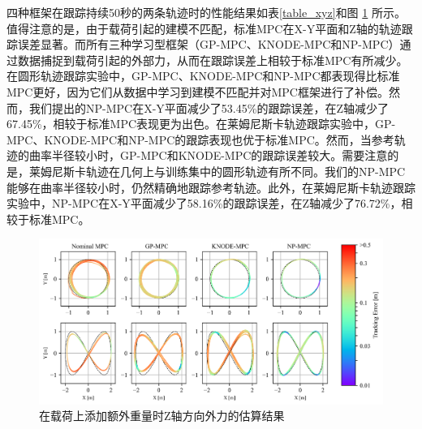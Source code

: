 \documentclass[lang=chs, degree=master, blindreview=false, winfonts=true]{yanputhesis}
\begin{document}
四种框架在跟踪持续50秒的两条轨迹时的性能结果如表\ref{table_xyz}和图 \ref{color} 所示。值得注意的是，由于载荷引起的建模不匹配，标准MPC在X-Y平面和Z轴的轨迹跟踪误差显著。而所有三种学习型框架（GP-MPC、KNODE-MPC和NP-MPC）通过数据捕捉到载荷引起的外部力，从而在跟踪误差上相较于标准MPC有所减少。在圆形轨迹跟踪实验中，GP-MPC、KNODE-MPC和NP-MPC都表现得比标准MPC更好，因为它们从数据中学习到建模不匹配并对MPC框架进行了补偿。然而，我们提出的NP-MPC在X-Y平面减少了53.45\%的跟踪误差，在Z轴减少了67.45\%，相较于标准MPC表现更为出色。在莱姆尼斯卡轨迹跟踪实验中，GP-MPC、KNODE-MPC和NP-MPC的跟踪表现也优于标准MPC。然而，当参考轨迹的曲率半径较小时，GP-MPC和KNODE-MPC的跟踪误差较大。需要注意的是，莱姆尼斯卡轨迹在几何上与训练集中的圆形轨迹有所不同。我们的NP-MPC能够在曲率半径较小时，仍然精确地跟踪参考轨迹。此外，在莱姆尼斯卡轨迹跟踪实验中，NP-MPC在X-Y平面减少了58.16\%的跟踪误差，在Z轴减少了76.72\%，相较于标准MPC。

\begin{figure}[hbt!]
	\centering
	\includegraphics[width=38pc]{picture/kk/color.png} 
	\caption{在载荷上添加额外重量时Z轴方向外力的估算结果} 
	\label{color}
\end{figure}
\end{document}
